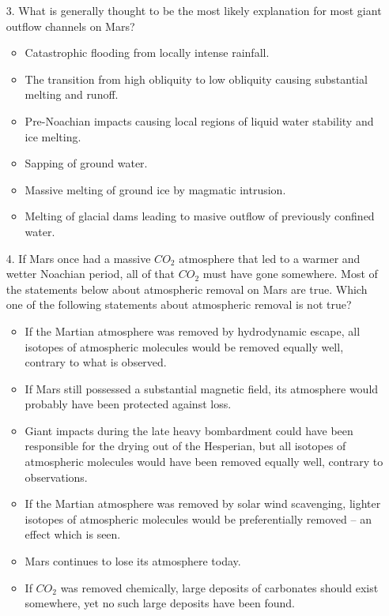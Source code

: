 \begin{enumerate}
    \item[3.] What is generally thought to be the most likely explanation for most giant outflow channels on Mars?
    
    \begin{itemize}[label={$\bullet$}]
        \item Catastrophic flooding from locally intense rainfall.
        \item The transition from high obliquity to low obliquity causing substantial melting and runoff.
        \item Pre-Noachian impacts causing local regions of liquid water stability and ice melting.
        \item Sapping of ground water.
        \item Massive melting of ground ice by magmatic intrusion.
        \item Melting of glacial dams leading to masive outflow of previously confined water.
    \end{itemize}

    \item[4.] If Mars once had a massive $CO_2$ atmosphere that led to a warmer and wetter Noachian period, all of that $CO_2$ must have gone somewhere. Most of the statements below about atmospheric removal on Mars are true. Which one of the following statements about atmospheric removal is not true?
    
    \begin{itemize}[label={$\bullet$}]
        \item  If the Martian atmosphere was removed by hydrodynamic escape, all isotopes of atmospheric molecules would be removed equally well, contrary to what is observed.
        \item If Mars still possessed a substantial magnetic field, its atmosphere would probably have been protected against loss.
        \item Giant impacts during the late heavy bombardment could have been responsible for the drying out of the Hesperian, but all isotopes of atmospheric molecules would have been removed equally well, contrary to observations.
        \item If the Martian atmosphere was removed by solar wind scavenging, lighter isotopes of atmospheric molecules would be preferentially removed  -- an effect which is seen.
        \item Mars continues to lose its atmosphere today.
        \item If $CO_2$ was removed chemically, large deposits of carbonates should exist somewhere, yet no such large deposits have been found.
    \end{itemize}
    

\end{enumerate}
